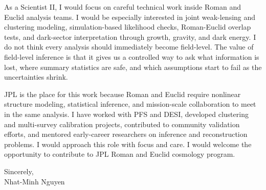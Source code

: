 \documentclass[11pt,letterpaper]{article}
\begin{document}
As a Scientist II, I would focus on careful technical work inside Roman and Euclid analysis teams. I would be especially interested in joint weak-lensing and clustering modeling, simulation-based likelihood checks, Roman-Euclid overlap tests, and dark-sector interpretation through growth, gravity, and dark energy. I do not think every analysis should immediately become field-level. The value of field-level inference is that it gives us a controlled way to ask what information is lost, where summary statistics are safe, and which assumptions start to fail as the uncertainties shrink.

JPL is the place for this work because Roman and Euclid require nonlinear structure modeling, statistical inference, and mission-scale collaboration to meet in the same analysis. I have worked with PFS and DESI, developed clustering and multi-survey calibration projects, contributed to community validation efforts, and mentored early-career researchers on inference and reconstruction problems. I would approach this role with focus and care. I would welcome the opportunity to contribute to JPL Roman and Euclid cosmology program.

\vspace{0.18cm}
Sincerely, \\
Nhat-Minh Nguyen
\end{document}
